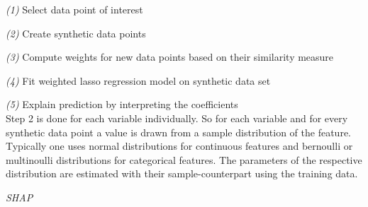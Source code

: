 \documentclass[12pt,titlepage]{article}
\begin{document}
\vspace{3mm}
\textit{(1)} Select data point of interest \par
\textit{(2)} Create synthetic data points \par
\textit{(3)} Compute weights for new data points based on their similarity measure \par
\textit{(4)} Fit weighted lasso regression model on synthetic data set \par
\textit{(5)} Explain prediction by interpreting the coefficients \\

Step 2 is done for each variable individually. So for each variable and for every synthetic data point a value is drawn from a sample distribution of the feature. Typically one uses normal distributions for continuous features and bernoulli or multinoulli distributions for categorical features. The parameters of the respective distribution are estimated with their sample-counterpart using the training data. \\

\vspace{3mm}

\textit{SHAP}
\end{document}

